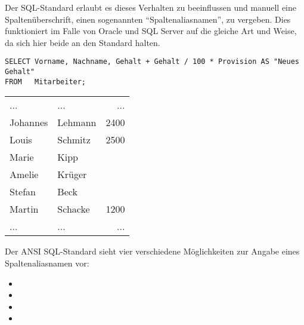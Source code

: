         Der SQL-Standard erlaubt es dieses Verhalten zu beeinflussen und manuell eine Spalten\"uberschrift, einen sogenannten \enquote{Spaltenaliasnamen}, zu vergeben. Dies funktioniert im Falle von Oracle und SQL Server auf die gleiche Art und Weise, da sich hier beide an den Standard halten.
        \begin{lstlisting}[language=oracle_sql,caption={Vergabe eines Spaltenaliasnamen},label=sql01_09]
SELECT Vorname, Nachname, Gehalt + Gehalt / 100 * Provision AS "Neues Gehalt"
FROM   Mitarbeiter;
        \end{lstlisting}
        \begin{center}
          \begin{small}
            \tablehead{}
            \begin{msoraclesql}
              \begin{supertabular}{llr}
                ... & ... & ... \\
                Johannes & Lehmann & 2400 \\
                Louis & Schmitz & 2500 \\
                Marie & Kipp &  \\
                Amelie & Kr\"uger &  \\
                Stefan & Beck &  \\
                Martin & Schacke & 1200 \\
                ... & ... & ... \\
              \end{supertabular}
            \end{msoraclesql}
          \end{small}
        \end{center}
        Der ANSI SQL-Standard sieht vier verschiedene M\"oglichkeiten zur Angabe eines Spaltenaliasnamen vor:
        \begin{itemize}
          \item {}
          \item {}
          \item {}
          \item {}
        \end{itemize}
